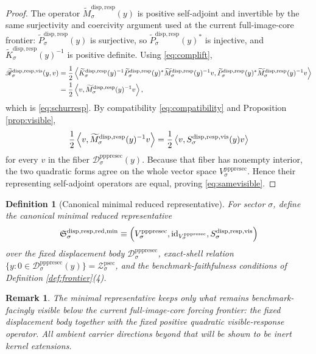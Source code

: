 \documentclass[11pt]{article}
\newcommand{\ProtoSectionShell}[1]{\mathcal Z_{#1}^{\mathrm{psec}}}
\newcommand{\PrePreProtoSectionVertical}[1]{V_{#1}^{\mathrm{pppresec}}}
\newcommand{\PrePreProtoSectionResidualBody}[1]{\mathcal D_{#1}^{\mathrm{pppresec}}}
\newcommand{\VisibleResponseOperator}[1]{S_{#1}^{\mathrm{disp,resp,vis}}}
\newcommand{\CompatibleProjection}[1]{\widetilde P_{#1}^{\mathrm{disp,resp}}}
\newcommand{\CompatibleOperator}[1]{\widetilde K_{#1}^{\mathrm{disp,resp}}}
\newcommand{\CompatibleSchur}[1]{\widetilde M_{#1}^{\mathrm{disp,resp}}}
\newcommand{\CompatibleResponse}[1]{\widetilde{\mathscr R}_{#1}^{\mathrm{disp,resp,vis}}}
\newcommand{\MinimalReducedStructure}{\mathfrak S^{\mathrm{disp,resp,red,min}}}
\newtheorem{definition}{Definition}
\newtheorem{remark}{Remark}
\begin{document}
\begin{proof}
The operator \(\CompatibleSchur{\sigma}(y)\) is positive self-adjoint and invertible by the same surjectivity and coercivity argument used at the current full-image-core frontier: \(\CompatibleProjection{\sigma}(y)\) is surjective, so \(\CompatibleProjection{\sigma}(y)^*\) is injective, and \(\CompatibleOperator{\sigma}(y)^{-1}\) is positive definite. Using \eqref{eq:complift},
\begin{align*}
\CompatibleResponse{\sigma}(y,v)
&=
\frac{1}{2}
\ev{
\CompatibleOperator{\sigma}(y)^{-1}
\CompatibleProjection{\sigma}(y)^*
\CompatibleSchur{\sigma}(y)^{-1}v,
\CompatibleProjection{\sigma}(y)^*
\CompatibleSchur{\sigma}(y)^{-1}v
} \\
&=
\frac{1}{2}
\ev{
v,
\CompatibleSchur{\sigma}(y)^{-1}v
},
\end{align*}
which is \eqref{eq:schurresp}. By compatibility \eqref{eq:compatibility} and Proposition \ref{prop:visible},
\[
\frac{1}{2}
\ev{v,\CompatibleSchur{\sigma}(y)^{-1}v}
=
\frac{1}{2}
\ev{v,\VisibleResponseOperator{\sigma}(y)v}
\]
for every \(v\) in the fiber \(\PrePreProtoSectionResidualBody{\sigma}(y)\). Because that fiber has nonempty interior, the two quadratic forms agree on the whole vector space \(\PrePreProtoSectionVertical{\sigma}\). Hence their representing self-adjoint operators are equal, proving \eqref{eq:samevisible}.
\end{proof}

\begin{definition}[Canonical minimal reduced representative]
\label{def:minimal}
For sector \(\sigma\), define the \emph{canonical minimal reduced representative}
\[
\MinimalReducedStructure_{\sigma}
\equiv
\Bigl(
\PrePreProtoSectionVertical{\sigma},
\mathrm{id}_{\PrePreProtoSectionVertical{\sigma}},
\VisibleResponseOperator{\sigma}
\Bigr)
\]
over the fixed displacement body \(\PrePreProtoSectionResidualBody{\sigma}\), exact-shell relation \(\{y:0\in\PrePreProtoSectionResidualBody{\sigma}(y)\}=\ProtoSectionShell{\sigma}\), and the benchmark-faithfulness conditions of Definition \ref{def:frontier}(4).
\end{definition}

\begin{remark}
The minimal representative keeps only what remains benchmark-facingly visible below the current full-image-core forcing frontier: the fixed displacement body together with the fixed positive quadratic visible-response operator. All ambient carrier directions beyond that will be shown to be inert kernel extensions.
\end{remark}
\end{document}
